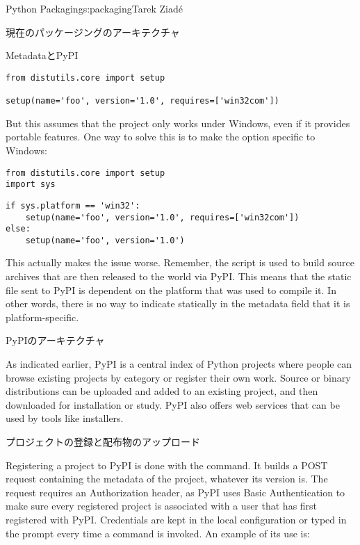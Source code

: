 \begin{aosachapter}{Python Packaging}{s:packaging}{Tarek Ziad\'{e}}
\begin{aosasect1}{現在のパッケージングのアーキテクチャ}
\begin{aosasect2}{MetadataとPyPI}
\begin{verbatim}
from distutils.core import setup

setup(name='foo', version='1.0', requires=['win32com'])
\end{verbatim}

\noindent But this assumes that the project only works under Windows, even if it
provides portable features.  One way to solve this is to make the
 option specific to Windows:

\begin{verbatim}
from distutils.core import setup
import sys
\end{verbatim}
\begin{verbatim}
if sys.platform == 'win32':
    setup(name='foo', version='1.0', requires=['win32com'])
else:
    setup(name='foo', version='1.0')
\end{verbatim}

\noindent This actually makes the issue worse. Remember, the script is used to
build source archives that are then released to the world via PyPI.
This means that the static  file sent to PyPI is
dependent on the platform that was used to compile it.  In other
words, there is no way to indicate statically in the metadata field
that it is platform-specific.

\end{aosasect2}

\begin{aosasect2}{PyPIのアーキテクチャ}


As indicated earlier, PyPI is a central index of Python projects where
people can browse existing projects by category or register their own
work.  Source or binary distributions can be uploaded and added to an
existing project, and then downloaded for installation or study.  PyPI
also offers web services that can be used by tools like installers.

\begin{aosasect3}{プロジェクトの登録と配布物のアップロード}

Registering a project to PyPI is done with the 
 command.  It builds a POST request containing the
metadata of the project, whatever its version is.  The request
requires an Authorization header, as PyPI uses Basic Authentication to
make sure every registered project is associated with a user that has
first registered with PyPI\@.  Credentials are kept in the local
 configuration or typed in the prompt every time a
 command is invoked.  An example of its use is:


\end{aosasect3}
\end{aosasect2}
\end{aosasect1}
\end{aosachapter}
